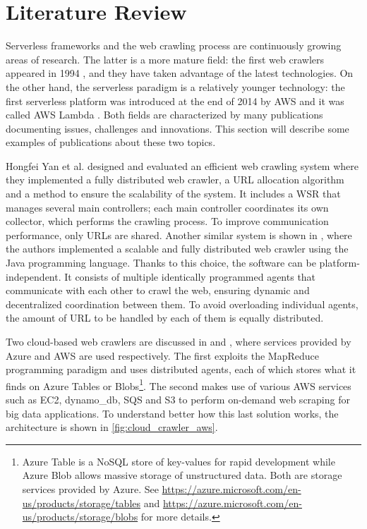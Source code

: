\documentclass[../thesis.tex]{subfiles}
\begin{document}
\chapter{Literature Review}\label{cap:literature_review}
Serverless frameworks and the web crawling process are continuously growing areas of research. The latter is a more mature field: the first web crawlers appeared in 1994 \cite{article:history_web_crawler_2014}, and they have taken advantage of the latest technologies. On the other hand, the serverless paradigm is a relatively younger technology: the first serverless platform was introduced at the end of 2014 by \acrshort{AWS} and it was called \acrshort{AWS} Lambda \cite{site:introducing_aws_lambda}.
Both fields are characterized by many publications documenting issues, challenges and innovations. This section will describe some examples of publications about these two topics.

Hongfei Yan et al. designed and evaluated an efficient web crawling system \cite{article:design_evaluation_efficient_crawler_2002} where they implemented a fully distributed web crawler, a \acrshort{URL} allocation algorithm and a method to ensure the scalability of the system. It includes a \acrfull{WSR} that manages several main controllers; each main controller coordinates its own collector, which performs the crawling process. To improve communication performance, only \acrshort{URL}s are shared. Another similar system is shown in \cite{article:ubi_distributed_crawler_2004}, where the authors implemented a scalable and fully distributed web crawler using the Java programming language. Thanks to this choice, the software can be platform-independent. It consists of multiple identically programmed agents that communicate with each other to crawl the web, ensuring dynamic and decentralized coordination between them. To avoid overloading individual agents, the amount of \acrshort{URL} to be handled by each of them is equally distributed.

Two cloud-based web crawlers are discussed in \cite{inproceedings:cloud_based_crawler_2015} and \cite{inproceedings:cloud_web_scraping_2017}, where services provided by Azure and \acrshort{AWS} are used respectively. The first exploits the MapReduce programming paradigm and uses distributed agents, each of which stores what it finds on Azure Tables or Blobs\footnote{Azure Table is a NoSQL store of key-values for rapid development while Azure Blob allows massive storage of unstructured data. Both are storage services provided by Azure. See \href{https://azure.microsoft.com/en-us/products/storage/tables}{https://azure.microsoft.com/en-us/products/storage/tables} and \href{https://azure.microsoft.com/en-us/products/storage/blobs}{https://azure.microsoft.com/en-us/products/storage/blobs} for more details.}. The second makes use of various \acrshort{AWS} services such as \acrshort{EC2}, \gls{dynamo_db}, \acrshort{SQS} and \acrshort{S3} to perform on-demand web scraping for big data applications. To understand better how this last solution works, the architecture is shown in \autoref{fig:cloud_crawler_aws}.
\end{document}
